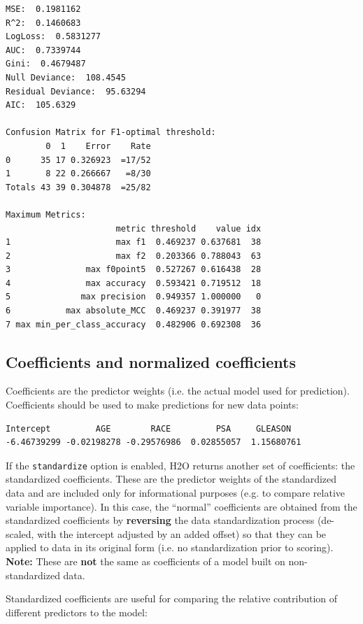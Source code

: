 \begin{lstlisting}[style=output]
MSE:  0.1981162
R^2:  0.1460683
LogLoss:  0.5831277
AUC:  0.7339744
Gini:  0.4679487
Null Deviance:  108.4545
Residual Deviance:  95.63294
AIC:  105.6329

Confusion Matrix for F1-optimal threshold:
        0  1    Error    Rate
0      35 17 0.326923  =17/52
1       8 22 0.266667   =8/30
Totals 43 39 0.304878  =25/82

Maximum Metrics:
                      metric threshold    value idx
1                     max f1  0.469237 0.637681  38
2                     max f2  0.203366 0.788043  63
3               max f0point5  0.527267 0.616438  28
4               max accuracy  0.593421 0.719512  18
5              max precision  0.949357 1.000000   0
6           max absolute_MCC  0.469237 0.391977  38
7 max min_per_class_accuracy  0.482906 0.692308  36
\end{lstlisting}

\subsection{Coefficients and normalized coefficients}

Coefficients are the predictor weights (i.e. the actual model used for prediction).  Coefficients should be used to
make predictions for new data points:


\begin{lstlisting}[style=output]
  Intercept         AGE        RACE         PSA     GLEASON 
-6.46739299 -0.02198278 -0.29576986  0.02855057  1.15680761 
\end{lstlisting}

If the \texttt{standardize} option is enabled, H2O returns another set of coefficients: the standardized
coefficients. These are the predictor weights of the standardized data and are included only for informational
purposes (e.g. to compare relative variable importance). In this case, the ``normal'' coefficients are obtained
from the standardized coefficients by \textbf{reversing} the data standardization process (de-scaled, with the
intercept adjusted by an added offset) so that they can be applied to data in its original form (i.e. no
standardization prior to scoring). \textbf{Note:} These are \textbf{not} the same as coefficients of a model built
on non-standardized data.

Standardized coefficients are useful for comparing the relative contribution of different predictors to the
model:

